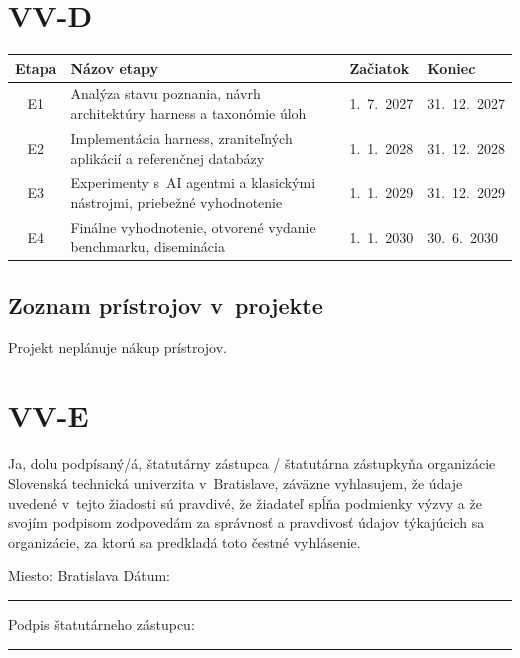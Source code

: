 \documentclass[10pt,a4paper]{article}
\begin{document}
\section*{VV-D }
\begin{tabularx}{\textwidth}{|c|X|l|l|}
\hline
\rowcolor{formbg}\textbf{Etapa} & \textbf{Názov etapy} & \textbf{Začiatok} & \textbf{Koniec} \\ \hline
E1 & Analýza stavu poznania, návrh architektúry harness a taxonómie úloh & 1.~7.~2027 & 31.~12.~2027 \\ \hline
E2 & Implementácia harness, zraniteľných aplikácií a referenčnej databázy & 1.~1.~2028 & 31.~12.~2028 \\ \hline
E3 & Experimenty s~AI agentmi a klasickými nástrojmi, priebežné vyhodnotenie & 1.~1.~2029 & 31.~12.~2029 \\ \hline
E4 & Finálne vyhodnotenie, otvorené vydanie benchmarku, diseminácia & 1.~1.~2030 & 30.~6.~2030 \\ \hline
\end{tabularx}

\subsection*{Zoznam prístrojov v~projekte}
Projekt neplánuje nákup prístrojov.

\section*{VV-E }
Ja, dolu podpísaný/á, štatutárny zástupca / štatutárna zástupkyňa organizácie Slovenská technická univerzita v~Bratislave, záväzne vyhlasujem, že údaje uvedené v~tejto žiadosti sú pravdivé, že žiadateľ spĺňa podmienky výzvy a že svojím podpisom zodpovedám za správnosť a pravdivosť údajov týkajúcich sa organizácie, za ktorú sa predkladá toto čestné vyhlásenie.

\medskip\noindent Miesto: Bratislava \hfill Dátum: \rule{3cm}{0.4pt} \hfill Podpis štatutárneho zástupcu: \rule{4cm}{0.4pt}
\end{document}
